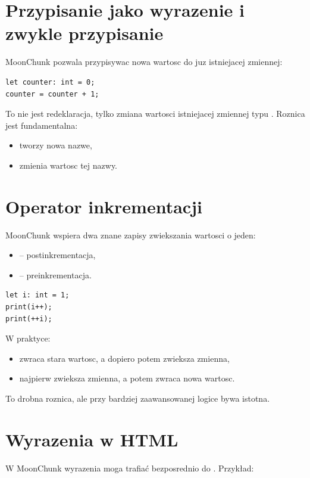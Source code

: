 \section{Przypisanie jako wyrazenie i zwykle przypisanie}
MoonChunk pozwala przypisywac nowa wartosc do juz istniejacej zmiennej:

\begin{lstlisting}[style=moonchunk,caption={Zwykle przypisanie}]
let counter: int = 0;
counter = counter + 1;
\end{lstlisting}

To nie jest redeklaracja, tylko zmiana wartosci istniejacej zmiennej typu .
Roznica jest fundamentalna:

\begin{itemize}
  \item {} tworzy nowa nazwe,
  \item {} zmienia wartosc tej nazwy.
\end{itemize}

\section{Operator inkrementacji}
MoonChunk wspiera dwa znane zapisy zwiekszania wartosci o jeden:

\begin{itemize}
  \item {} -- postinkrementacja,
  \item {} -- preinkrementacja.
\end{itemize}

\begin{lstlisting}[style=moonchunk,caption={Preinkrementacja i postinkrementacja}]
let i: int = 1;
print(i++);
print(++i);
\end{lstlisting}

W praktyce:

\begin{itemize}
  \item {} zwraca stara wartosc, a dopiero potem zwieksza zmienna,
  \item {} najpierw zwieksza zmienna, a potem zwraca nowa wartosc.
\end{itemize}

To drobna roznica, ale przy bardziej zaawansowanej logice bywa istotna.

\section{Wyrazenia w HTML}
W MoonChunk wyrazenia moga trafiać bezposrednio do . Przykład:


